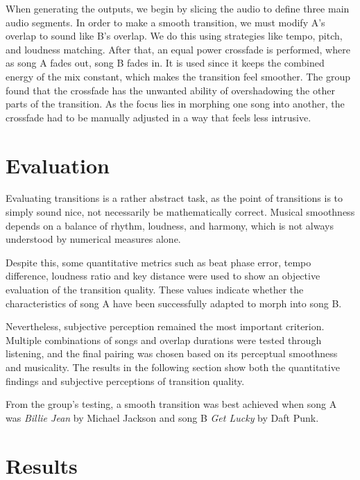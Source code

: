 \documentclass[12pt]{article}
\begin{document}
When generating the outputs, we begin by slicing the audio to define three main audio segments. In order to make a smooth transition, we must modify A's overlap to sound like B's overlap. We do this using strategies like tempo, pitch, and loudness matching. After that, an equal power crossfade is performed, where as song A fades out, song B fades in. It is used since it keeps the combined energy of the mix constant, which makes the transition feel smoother. The group found that the crossfade has the unwanted ability of overshadowing the other parts of the transition. As the focus lies in morphing one song into another, the crossfade had to be manually adjusted in a way that feels less intrusive.



\section{Evaluation}

Evaluating transitions is a rather abstract task, as the point of transitions is to simply sound nice, not necessarily be mathematically correct. Musical smoothness depends on a balance of rhythm, loudness, and harmony, which is not always understood by numerical measures alone.

Despite this, some quantitative metrics such as beat phase error, tempo difference, loudness ratio and key distance were used to show an objective evaluation of the transition quality. These values indicate whether the characteristics of song A have been successfully adapted to morph into song B.

Nevertheless, subjective perception remained the most important criterion. Multiple combinations of songs and overlap durations were tested through listening, and the final pairing was chosen based on its perceptual smoothness and musicality. The results in the following section show both the quantitative findings and subjective perceptions of transition quality.

From the group's testing, a smooth transition was best achieved when song A was \textit{Billie Jean} by Michael Jackson and song B \textit{Get Lucky} by Daft Punk.



\section{Results}
\end{document}

